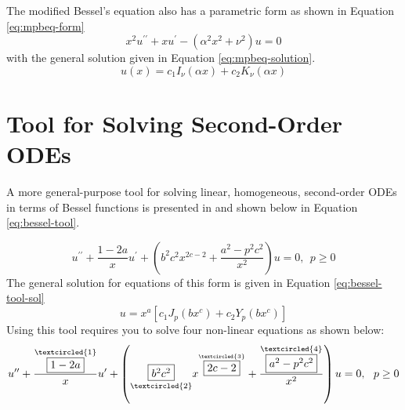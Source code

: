The modified Bessel's equation also has a parametric form as shown in Equation \ref{eq:mpbeq-form}
\begin{equation}
x^2u^{\prime \prime} + xu^{\prime} - \left(\alpha^2 x^2 + \nu^2 \right)u = 0
\label{eq:mpbeq-form}
\end{equation}
with the general solution given in Equation \ref{eq:mpbeq-solution}.
\begin{equation}
u(x) = c_1I_{\nu}(\alpha x) + c_2 K_{\nu}(\alpha x)
\label{eq:mpbeq-solution}
\end{equation}

\section{Tool for Solving Second-Order ODEs}
A more general-purpose tool for solving linear, homogeneous, second-order ODEs in terms of Bessel functions is presented in \cite{zill2020advanced} and shown below in Equation \ref{eq:bessel-tool}.

\begin{equation}
u^{\prime \prime} + \frac{1-2a}{x}u^{\prime} + \left(b^2 c^2 x^{2c-2} + \frac{a^2-p^2c^2}{x^2} \right)u = 0, \ \ p \ge 0
\label{eq:bessel-tool}
\end{equation}
The general solution for equations of this form is given in Equation \ref{eq:bessel-tool-sol}
\begin{equation}
u = x^a\left[c_1 J_{p}\left(bx^c \right)+c_2Y_{p}\left(bx^c \right) \right]
\label{eq:bessel-tool-sol}
\end{equation}
Using this tool requires you to solve four non-linear equations as shown below:
\begin{equation*}
u^{\prime \prime} + \frac{\overset{\textcircled{1}}{\fbox{$1-2a$}}}{x}u^{\prime} + \left(\underset{\textcircled{2}}{\fbox{$b^2 c^2$}} x^{\overset{\textcircled{3}}{\fbox{$2c-2$}}} + \frac{\overset{\textcircled{4}}{\fbox{$a^2-p^2c^2$}}}{x^2} \right)u = 0, \ \ p \ge 0
\end{equation*}

\vspace{0.5cm}


